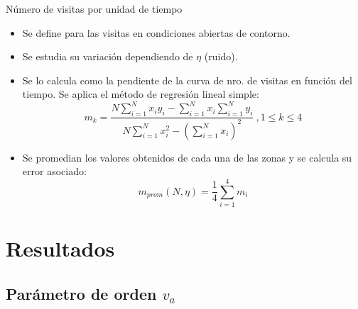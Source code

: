 \documentclass{beamer}
\begin{document}
            \begin{frame}{Número de visitas por unidad de tiempo}
                \begin{itemize}
                    \item Se define para las visitas en condiciones abiertas de contorno.
                    \item Se estudia su variación dependiendo de $\eta$ (ruido).
                    \item Se lo calcula como la pendiente de la curva de nro. de visitas en función del tiempo.
                    Se aplica el método de regresión lineal simple:
                    \begin{equation}
                        m_k = \frac{N \sum_{i=1}^N x_i y_i - \sum_{i=1}^N x_i \sum_{i=1}^N y_i }{N \sum_{i=1}^N x_i^2 - \left(\sum_{i=1}^N x_i \right)^2}
                        \ , 1 \leq k \leq 4
                    \end{equation}
                    \item Se promedian los valores obtenidos de cada una de las zonas y se calcula su error asociado:
                    \begin{equation}
                        m_{prom}(N,\eta) = \frac{1}{4} \sum_{i=1}^{4} m_i
                    \end{equation}
                \end{itemize}
            \end{frame}


    \section{Resultados}

        \subsection{Parámetro de orden $v_a$}
\end{document}
